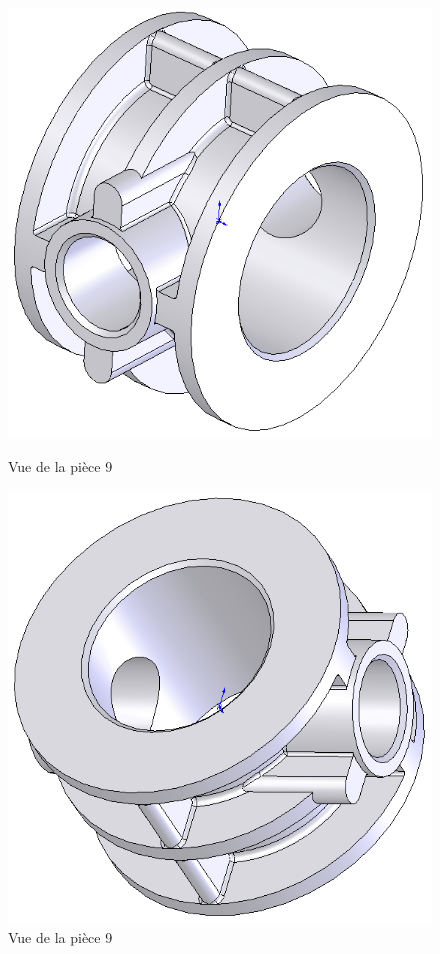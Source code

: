 \begin{figure}[htbp]
\begin{minipage}[c]{.4\linewidth}
\begin{center}
\includegraphics[width=0.9\linewidth]{img/palier1.png}
\caption{Vue de la pièce 9}
\label{fig:image6}
\end{center}
\end{minipage}
\hfill
\begin{minipage}[c]{.4\linewidth}
\begin{center}
\includegraphics[width=0.9\linewidth]{img/palier2.png}
\caption{Vue de la pièce 9}
\label{fig:image7}
\end{center}
\end{minipage}
\end{figure}

